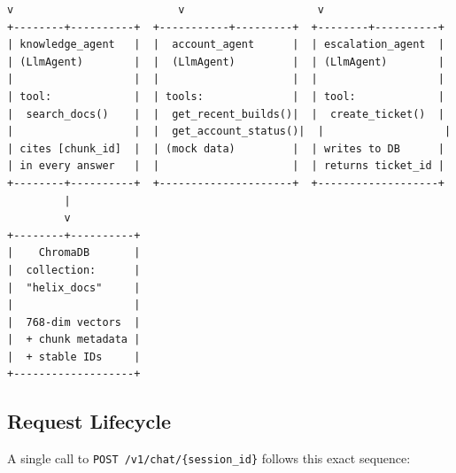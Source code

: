 \documentclass[12pt,a4paper]{article}
\begin{document}
\begin{center}
\begin{tcolorbox}[codebox]
\begin{lstlisting}[numbers=none, basicstyle=\ttfamily\scriptsize]
         v                          v                     v
+--------+----------+  +-----------+---------+  +--------+----------+
| knowledge_agent   |  |  account_agent      |  | escalation_agent  |
| (LlmAgent)        |  |  (LlmAgent)         |  | (LlmAgent)        |
|                   |  |                     |  |                   |
| tool:             |  | tools:              |  | tool:             |
|  search_docs()    |  |  get_recent_builds()|  |  create_ticket()  |
|                   |  |  get_account_status()|  |                   |
| cites [chunk_id]  |  | (mock data)         |  | writes to DB      |
| in every answer   |  |                     |  | returns ticket_id |
+--------+----------+  +---------------------+  +-------------------+
         |
         v
+--------+----------+
|    ChromaDB       |
|  collection:      |
|  "helix_docs"     |
|                   |
|  768-dim vectors  |
|  + chunk metadata |
|  + stable IDs     |
+-------------------+
\end{lstlisting}
\end{tcolorbox}
\end{center}

\subsection{Request Lifecycle}

A single call to \texttt{POST /v1/chat/\{session\_id\}} follows this exact sequence:
\end{document}
